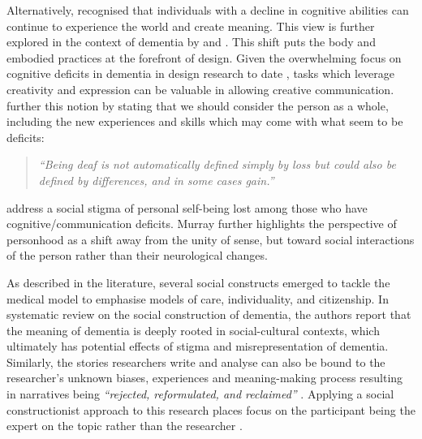 Alternatively, \cite{gallagher_merleau-pontys_2010} recognised that individuals with a decline in cognitive abilities can continue to experience the world and create meaning. This view is further explored in the context of dementia by \cite{kontos_embodied_2005} and \cite{twigg_dress_2013}. This shift puts the body and embodied practices at the forefront of design. Given the overwhelming focus on cognitive deficits in dementia in design research to date \citep{lazar_critical_2017}, tasks which leverage creativity and expression can be valuable in allowing creative communication. \cite{bauman_l._&_murray_deaf_2014} further this notion by stating that we should consider the person as a whole, including the new experiences and skills which may come with what seem to be deficits:
\begin{quote}
    \textit{``Being deaf is not automatically defined simply by loss but could also be defined by differences, and in some cases gain.''}
\end{quote}

\cite{bauman_l._&_murray_deaf_2014} address a social stigma of personal self-being lost among those who have cognitive/communication deficits. Murray further highlights the perspective of personhood as a shift away from the unity of sense, but toward social interactions of the person rather than their neurological changes.

As described in the literature, several social constructs emerged to tackle the medical model to emphasise models of care, individuality, and citizenship. In \cite{bosco2019social} systematic review on the social construction of dementia, the authors report that the meaning of dementia is deeply rooted in social-cultural contexts, which ultimately has potential effects of stigma and misrepresentation of dementia. Similarly, the stories researchers write and analyse can also be bound to the researcher's unknown biases, experiences and meaning-making process resulting in narratives being \textit{``rejected, reformulated, and reclaimed''} \citep[pg.850]{mcgovern2014forgotten}. Applying a social constructionist approach to this research places focus on the participant being the expert on the topic rather than the researcher \citep{padgett2016qualitative}.

